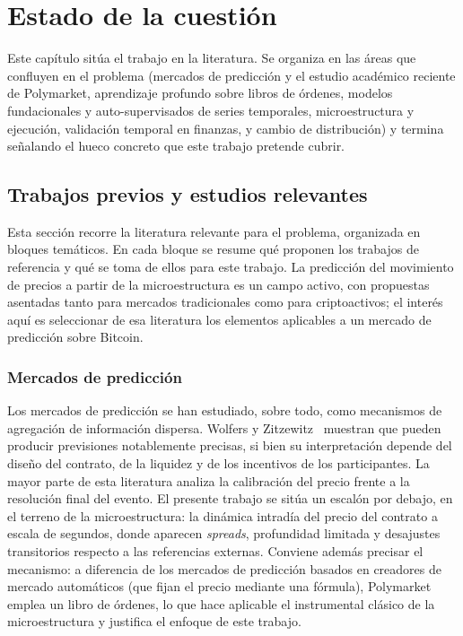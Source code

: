 %
\chapter{Estado de la cuestión}
\label{ch::estado}

Este capítulo sitúa el trabajo en la literatura. Se organiza en las áreas que confluyen
en el problema (mercados de predicción y el estudio académico reciente de Polymarket,
aprendizaje profundo sobre libros de órdenes, modelos fundacionales y auto-supervisados
de series temporales, microestructura y ejecución, validación temporal en finanzas, y
cambio de distribución) y termina señalando el hueco concreto que este trabajo pretende
cubrir.

\section{Trabajos previos y estudios relevantes}

Esta sección recorre la literatura relevante para el problema, organizada en bloques
temáticos. En cada bloque se resume qué proponen los trabajos de referencia y qué se toma
de ellos para este trabajo. La predicción del movimiento de precios a partir de la
microestructura es un campo activo, con propuestas asentadas tanto para mercados
tradicionales como para criptoactivos; el interés aquí es seleccionar de esa literatura los
elementos aplicables a un mercado de predicción sobre Bitcoin.

\subsection{Mercados de predicción}

Los mercados de predicción se han estudiado, sobre todo, como mecanismos de agregación de
información dispersa. Wolfers y Zitzewitz~\cite{wolfers2004prediction} muestran que pueden
producir previsiones notablemente precisas, si bien su interpretación depende del diseño
del contrato, de la liquidez y de los incentivos de los participantes. La mayor parte de
esta literatura analiza la calibración del precio frente a la resolución final del evento.
El presente trabajo se sitúa un escalón por debajo, en el terreno de la microestructura:
la dinámica intradía del precio del contrato a escala de segundos, donde aparecen
\emph{spreads}, profundidad limitada y desajustes transitorios respecto a las referencias
externas. Conviene además precisar el mecanismo: a diferencia de los mercados de predicción
basados en creadores de mercado automáticos (que fijan el precio mediante una fórmula),
Polymarket emplea un libro de órdenes, lo que hace aplicable el instrumental clásico de la
microestructura y justifica el enfoque de este trabajo.

